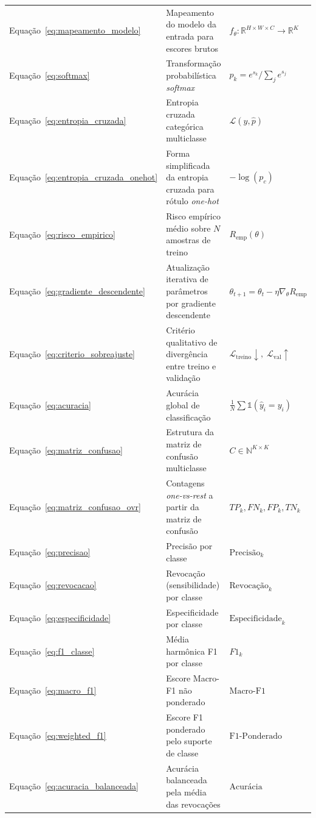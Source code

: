 \documentclass[
    12pt,
    openright,
    oneside,
    a4paper,
    english,
    brazil
]{abntex2}
\begin{document}
\begin{longtable}{@{}p{2.9cm}p{7.8cm}p{\dimexpr\textwidth-10.7cm-4\tabcolsep\relax}@{}}
Equação~\eqref{eq:mapeamento_modelo} & Mapeamento do modelo da entrada para escores brutos & \(f_\theta: \mathbb{R}^{H\times W\times C} \to \mathbb{R}^K\) \\
Equação~\eqref{eq:softmax} & Transformação probabilística \textit{softmax} & \(p_k = e^{s_k}/\sum_j e^{s_j}\) \\
Equação~\eqref{eq:entropia_cruzada} & Entropia cruzada categórica multiclasse & \(\mathcal{L}(y,\hat{p})\) \\
Equação~\eqref{eq:entropia_cruzada_onehot} & Forma simplificada da entropia cruzada para rótulo \textit{one-hot} & \(-\log(p_c)\) \\
Equação~\eqref{eq:risco_empirico} & Risco empírico médio sobre \(N\) amostras de treino & \(R_{\text{emp}}(\theta)\) \\
Equação~\eqref{eq:gradiente_descendente} & Atualização iterativa de parâmetros por gradiente descendente & \(\theta_{t+1} = \theta_t - \eta\nabla_\theta R_{\text{emp}}\) \\
Equação~\eqref{eq:criterio_sobreajuste} & Critério qualitativo de divergência entre treino e validação & \(\mathcal{L}_{\text{treino}}\!\downarrow,\; \mathcal{L}_{\text{val}}\!\uparrow\) \\
Equação~\eqref{eq:acuracia} & Acurácia global de classificação & \(\frac{1}{N}\sum \mathbb{1}(\hat{y}_i = y_i)\) \\
Equação~\eqref{eq:matriz_confusao} & Estrutura da matriz de confusão multiclasse & \(C \in \mathbb{N}^{K \times K}\) \\
Equação~\eqref{eq:matriz_confusao_ovr} & Contagens \textit{one-vs-rest} a partir da matriz de confusão & \(TP_k, FN_k, FP_k, TN_k\) \\
Equação~\eqref{eq:precisao} & Precisão por classe & \(\text{Precisão}_k\) \\
Equação~\eqref{eq:revocacao} & Revocação (sensibilidade) por classe & \(\text{Revocação}_k\) \\
Equação~\eqref{eq:especificidade} & Especificidade por classe & \(\text{Especificidade}_k\) \\
Equação~\eqref{eq:f1_classe} & Média harmônica F1 por classe & \(F1_k\) \\
Equação~\eqref{eq:macro_f1} & Escore Macro-F1 não ponderado & \(\text{Macro-F1}\) \\
Equação~\eqref{eq:weighted_f1} & Escore F1 ponderado pelo suporte de classe & \(\text{F1-Ponderado}\) \\
Equação~\eqref{eq:acuracia_balanceada} & Acurácia balanceada pela média das revocações & \(\text{Acurácia Balanceada}\) \\

\end{longtable}
\end{document}
